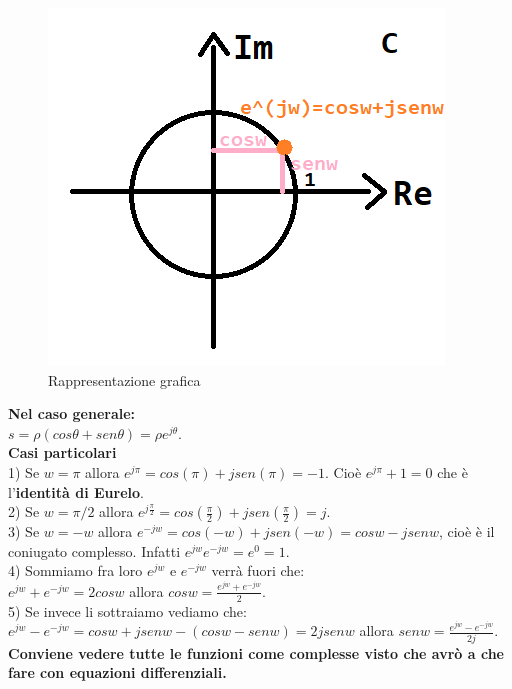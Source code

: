 \begin{figure}[h]
	\centering
	\includegraphics[scale=0.5]{immagini/rappEsp}
	\caption{ Rappresentazione grafica }
	\label{fig: rappEsp}
\end{figure}

\textbf{Nel caso generale:}\\
$ s = \rho ( cos \theta + sen \theta ) = \rho e^{j \theta} $.\\

\textbf{Casi particolari}\\
1) Se $ w = \pi $ allora $ e^{j \pi} = cos( \pi) + j sen(\pi) = -1$. Cioè $ e^{j \pi} +1=0 $ che è l'\textbf{identità di Eurelo}.\\
2) Se $ w = \pi/2 $ allora $ e^{j\frac{\pi}{2}} = cos( \frac{\pi}{2}) + j sen(\frac{\pi}{2}) = j$.\\
3) Se $ w = -w $ allora $ e^{-jw} = cos( -w) + j sen(-w) = cosw-jsenw $, cioè è il coniugato complesso. Infatti $ e^{jw} e^{-jw} = e^{0} = 1 $.\\
4) Sommiamo fra loro $e^{jw}$ e $e^{-jw}$ verrà fuori che:\\
$ e^{jw} + e^{-jw} = 2 cosw $ allora $ cosw = \frac{e^{jw} + e^{-jw}}{2} $.\\
5) Se invece li sottraiamo vediamo che:\\
$ e^{jw} - e^{-jw} = cosw+jsenw-(cosw-senw)=2jsenw $ allora $ senw = \frac{e^{jw} - e^{-jw}}{2j} $.\\


\textbf{Conviene vedere tutte le funzioni come complesse visto che avrò a che fare con equazioni differenziali.}



















